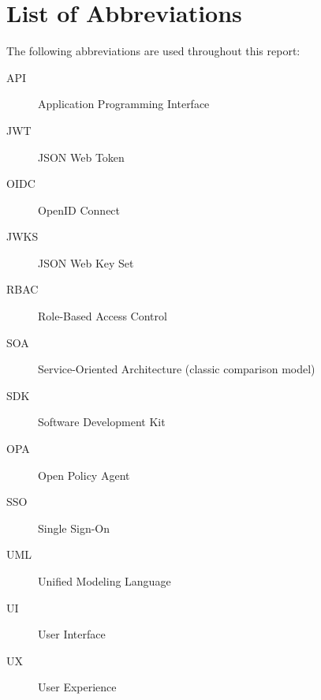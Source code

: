 \chapter*{List of Abbreviations}

The following abbreviations are used throughout this report:

\begin{description}
  \item[API] Application Programming Interface
  \item[JWT] JSON Web Token
  \item[OIDC] OpenID Connect
  \item[JWKS] JSON Web Key Set
  \item[RBAC] Role-Based Access Control
  \item[SOA] Service-Oriented Architecture (classic comparison model)
  \item[SDK] Software Development Kit
  \item[OPA] Open Policy Agent
  \item[SSO] Single Sign-On
  \item[UML] Unified Modeling Language
  \item[UI] User Interface
  \item[UX] User Experience
\end{description}

